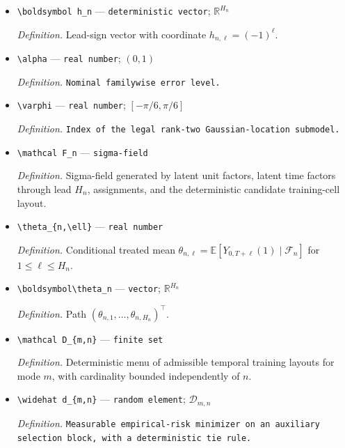 \documentclass{article}
\begin{document}
\begin{itemize}
  \item \texttt{\textbackslash{}\allowbreak{}boldsymbol h\_\allowbreak{}n} --- \texttt{deterministic vector}; \(\mathbb R^{H_n}\)
  \par\smallskip\noindent\emph{Definition.} Lead-sign vector with coordinate \(h_{n,\ell}=(-1)^\ell\).
  \item \texttt{\textbackslash{}\allowbreak{}alpha} --- \texttt{real number}; \((0,1)\)
  \par\smallskip\noindent\emph{Definition.} \texttt{Nominal familywise error level.}
  \item \texttt{\textbackslash{}\allowbreak{}varphi} --- \texttt{real number}; \([-\pi/6,\pi/6]\)
  \par\smallskip\noindent\emph{Definition.} \texttt{Index of the legal rank-\allowbreak{}two Gaussian-\allowbreak{}location submodel.}
  \item \texttt{\textbackslash{}\allowbreak{}mathcal F\_\allowbreak{}n} --- \texttt{sigma-\allowbreak{}field}
  \par\smallskip\noindent\emph{Definition.} Sigma-field generated by latent unit factors, latent time factors through lead \(H_n\), assignments, and the deterministic candidate training-cell layout.
  \item \texttt{\textbackslash{}\allowbreak{}theta\_\allowbreak{}\{n,\allowbreak{}\textbackslash{}\allowbreak{}ell\}\allowbreak{}} --- \texttt{real number}
  \par\smallskip\noindent\emph{Definition.} Conditional treated mean \(\theta_{n,\ell}=\mathbb E[Y_{0,T+\ell}(1)\mid\mathcal F_n]\) for \(1\le\ell\le H_n\).
  \item \texttt{\textbackslash{}\allowbreak{}boldsymbol\textbackslash{}\allowbreak{}theta\_\allowbreak{}n} --- \texttt{vector}; \(\mathbb R^{H_n}\)
  \par\smallskip\noindent\emph{Definition.} Path \((\theta_{n,1},\ldots,\theta_{n,H_n})^{\top}\).
  \item \texttt{\textbackslash{}\allowbreak{}mathcal D\_\allowbreak{}\{m,\allowbreak{}n\}\allowbreak{}} --- \texttt{finite set}
  \par\smallskip\noindent\emph{Definition.} Deterministic menu of admissible temporal training layouts for mode \(m\), with cardinality bounded independently of \(n\).
  \item \texttt{\textbackslash{}\allowbreak{}widehat d\_\allowbreak{}\{m,\allowbreak{}n\}\allowbreak{}} --- \texttt{random element}; \(\mathcal D_{m,n}\)
  \par\smallskip\noindent\emph{Definition.} \texttt{Measurable empirical-\allowbreak{}risk minimizer on an auxiliary selection block,\allowbreak{} with a deterministic tie rule.}

\end{itemize}
\end{document}
